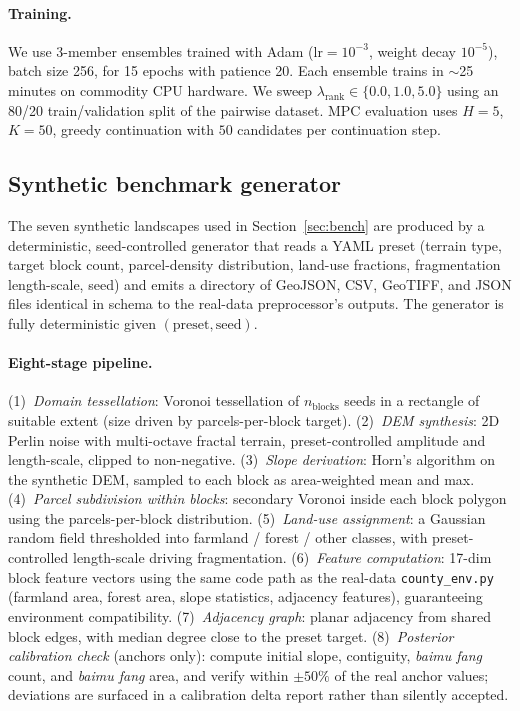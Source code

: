 \documentclass[11pt]{article}
\begin{document}
\paragraph{Training.} We use 3-member ensembles trained with Adam ($\text{lr}=10^{-3}$, weight decay $10^{-5}$), batch size 256, for 15 epochs with patience 20. Each ensemble trains in $\sim$25 minutes on commodity CPU hardware. We sweep $\lambda_{\text{rank}} \in \{0.0, 1.0, 5.0\}$ using an 80/20 train/validation split of the pairwise dataset. MPC evaluation uses $H{=}5$, $K{=}50$, greedy continuation with $50$ candidates per continuation step.

\subsection{Synthetic benchmark generator}\label{sec:methods-synth}

The seven synthetic landscapes used in Section~\ref{sec:bench} are produced by a deterministic, seed-controlled generator that reads a YAML preset (terrain type, target block count, parcel-density distribution, land-use fractions, fragmentation length-scale, seed) and emits a directory of GeoJSON, CSV, GeoTIFF, and JSON files identical in schema to the real-data preprocessor's outputs. The generator is fully deterministic given $(\text{preset}, \text{seed})$.

\paragraph{Eight-stage pipeline.} (1)~\emph{Domain tessellation}: Voronoi tessellation of $n_{\text{blocks}}$ seeds in a rectangle of suitable extent (size driven by parcels-per-block target). (2)~\emph{DEM synthesis}: 2D Perlin noise with multi-octave fractal terrain, preset-controlled amplitude and length-scale, clipped to non-negative. (3)~\emph{Slope derivation}: Horn's algorithm on the synthetic DEM, sampled to each block as area-weighted mean and max. (4)~\emph{Parcel subdivision within blocks}: secondary Voronoi inside each block polygon using the parcels-per-block distribution. (5)~\emph{Land-use assignment}: a Gaussian random field thresholded into farmland / forest / other classes, with preset-controlled length-scale driving fragmentation. (6)~\emph{Feature computation}: 17-dim block feature vectors using the same code path as the real-data \texttt{county\_env.py} (farmland area, forest area, slope statistics, adjacency features), guaranteeing environment compatibility. (7)~\emph{Adjacency graph}: planar adjacency from shared block edges, with median degree close to the preset target. (8)~\emph{Posterior calibration check} (anchors only): compute initial slope, contiguity, \textit{baimu fang} count, and \textit{baimu fang} area, and verify within $\pm 50\%$ of the real anchor values; deviations are surfaced in a calibration delta report rather than silently accepted.
\end{document}
